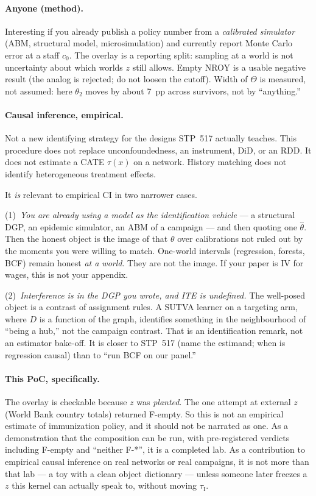\documentclass[11pt]{article}
\newcommand{\thr}{\tau_{\mathrm{I}}}
\begin{document}
\paragraph{Anyone (method).}
Interesting if you already publish a policy number from a
\emph{calibrated simulator} (ABM, structural model, microsimulation)
and currently report Monte Carlo error at a staff $c_0$. The overlay
is a reporting split: sampling at a world is not uncertainty about
which worlds $z$ still allows. Empty NROY is a usable negative result
(the analog is rejected; do not loosen the cutoff). Width of $\Theta$
is measured, not assumed: here $\theta_2$ moves by about 7~pp across
survivors, not by ``anything.''

\paragraph{Causal inference, empirical.}
Not a new identifying strategy for the designs STP~517 actually
teaches. This procedure does not replace unconfoundedness, an
instrument, DiD, or an RDD. It does not estimate a CATE $\tau(x)$ on a
network. History matching does not identify heterogeneous treatment
effects.

It \emph{is} relevant to empirical CI in two narrower cases.

(1)~\emph{You are already using a model as the identification
vehicle} --- a structural DGP, an epidemic simulator, an ABM of a
campaign --- and then quoting one $\hat\theta$. Then the honest object
is the image of that $\theta$ over calibrations not ruled out by the
moments you were willing to match. One-world intervals (regression,
forests, BCF) remain honest \emph{at a world}. They are not the image.
If your paper is IV for wages, this is not your appendix.

(2)~\emph{Interference is in the DGP you wrote, and ITE is undefined.}
The well-posed object is a contrast of assignment rules. A SUTVA
learner on a targeting arm, where $D$ is a function of the graph,
identifies something in the neighbourhood of ``being a hub,'' not the
campaign contrast. That is an identification remark, not an estimator
bake-off. It is closer to STP~517 (name the estimand; when is
regression causal) than to ``run BCF on our panel.''

\paragraph{This PoC, specifically.}
The overlay is checkable because $z$ was \emph{planted}. The one
attempt at external $z$ (World Bank country totals) returned F-empty.
So this is not an empirical estimate of immunization policy, and it
should not be narrated as one. As a demonstration that the composition
can be run, with pre-registered verdicts including F-empty and
``neither F-*'', it is a completed lab. As a contribution to empirical
causal inference on real networks or real campaigns, it is not more
than that lab --- a toy with a clean object dictionary --- unless
someone later freezes a $z$ this kernel can actually speak to, without
moving $\thr$.
\end{document}
